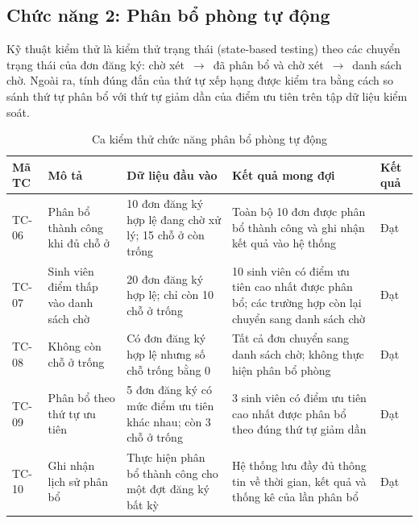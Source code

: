 \documentclass[../DoAn.tex]{subfiles}
\begin{document}
\subsection*{Chức năng 2: Phân bổ phòng tự động}

Kỹ thuật kiểm thử là kiểm thử trạng thái (state-based testing) theo các chuyển
trạng thái của đơn đăng ký: chờ xét~$\to$~đã phân bổ và chờ xét~$\to$~danh
sách chờ. Ngoài ra, tính đúng đắn của thứ tự xếp hạng được kiểm tra bằng cách
so sánh thứ tự phân bổ với thứ tự giảm dần của điểm ưu tiên trên tập dữ liệu
kiểm soát.

\vspace{-6pt}
\begin{table}[H]
\centering
\caption{Ca kiểm thử chức năng phân bổ phòng tự động}
\label{tab:tc_allocation}
\footnotesize

\begin{tabular}{|p{1.1cm}|p{2.5cm}|p{3.2cm}|p{4.0cm}|p{1.2cm}|}
\hline
\textbf{Mã TC} &
\textbf{Mô tả} &
\textbf{Dữ liệu đầu vào} &
\textbf{Kết quả mong đợi} &
\textbf{Kết quả} \\
\hline

TC-06 &
Phân bổ thành công khi đủ chỗ ở &
10 đơn đăng ký hợp lệ đang chờ xử lý; 15 chỗ ở còn trống &
Toàn bộ 10 đơn được phân bổ thành công và ghi nhận kết quả vào hệ thống &
Đạt \\
\hline

TC-07 &
Sinh viên điểm thấp vào danh sách chờ &
20 đơn đăng ký hợp lệ; chỉ còn 10 chỗ ở trống &
10 sinh viên có điểm ưu tiên cao nhất được phân bổ; các trường hợp còn lại chuyển sang danh sách chờ &
Đạt \\
\hline

TC-08 &
Không còn chỗ ở trống &
Có đơn đăng ký hợp lệ nhưng số chỗ trống bằng 0 &
Tất cả đơn chuyển sang danh sách chờ; không thực hiện phân bổ phòng &
Đạt \\
\hline

TC-09 &
Phân bổ theo thứ tự ưu tiên &
5 đơn đăng ký có mức điểm ưu tiên khác nhau; còn 3 chỗ ở trống &
3 sinh viên có điểm ưu tiên cao nhất được phân bổ theo đúng thứ tự giảm dần &
Đạt \\
\hline

TC-10 &
Ghi nhận lịch sử phân bổ &
Thực hiện phân bổ thành công cho một đợt đăng ký bất kỳ &
Hệ thống lưu đầy đủ thông tin về thời gian, kết quả và thống kê của lần phân bổ &
Đạt \\
\hline

\end{tabular}
\end{table}
\vspace{-4pt}
\end{document}
